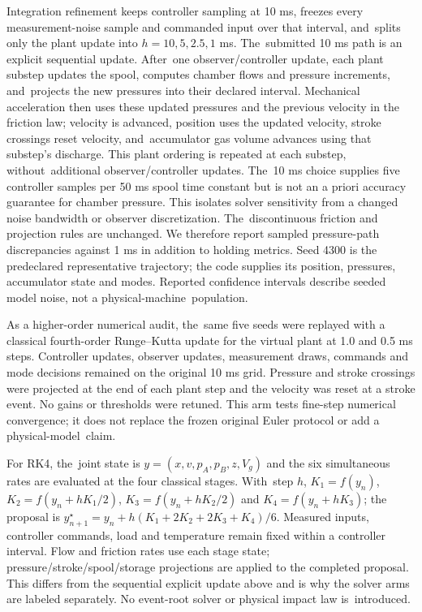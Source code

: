 \documentclass[machines,article,submit,pdftex,moreauthors]{Definitions/mdpi}
\begin{document}
Integration refinement keeps controller sampling at 10 ms, freezes every measurement-noise sample and commanded input over that interval, and~splits only the plant update into $h=10,5,2.5,1$ ms. The~submitted 10 ms path is an explicit sequential update. After~one observer/controller update, each plant substep updates the spool, computes chamber flows and pressure increments, and~projects the new pressures into their declared interval. Mechanical acceleration then uses these updated pressures and the previous velocity in the friction law; velocity is advanced, position uses the updated velocity, stroke crossings reset velocity, and~accumulator gas volume advances using that substep's discharge. This plant ordering is repeated at each substep, without~additional observer/controller updates. The~10 ms choice supplies five controller samples per 50 ms spool time constant but is not an a priori accuracy guarantee for chamber pressure. This isolates solver sensitivity from a changed noise bandwidth or observer discretization. The~discontinuous friction and projection rules are unchanged. We therefore report sampled pressure-path discrepancies against 1 ms in addition to holding metrics. Seed 4300 is the predeclared representative trajectory; the code supplies its position, pressures, accumulator state and modes. Reported confidence intervals describe seeded model noise, not a physical-machine~population.

As a higher-order numerical audit, the~same five seeds were replayed with a classical fourth-order Runge--Kutta update for the virtual plant at 1.0 and 0.5 ms steps. Controller updates, observer updates, measurement draws, commands and mode decisions remained on the original 10 ms grid. Pressure and stroke crossings were projected at the end of each plant step and the velocity was reset at a stroke event. No gains or thresholds were retuned. This arm tests fine-step numerical convergence; it does not replace the frozen original Euler protocol or add a physical-model~claim.

For RK4, the~joint state is $y=(x,v,p_A,p_B,z,V_g)$ and the six simultaneous rates are evaluated at the four classical stages. With~step $h$, $K_1=f(y_n)$, $K_2=f(y_n+hK_1/2)$, $K_3=f(y_n+hK_2/2)$ and $K_4=f(y_n+hK_3)$; the proposal is $y_{n+1}^{\star}=y_n+h(K_1+2K_2+2K_3+K_4)/6$. Measured inputs, controller commands, load and temperature remain fixed within a controller interval. Flow and friction rates use each stage state; pressure/stroke/spool/storage projections are applied to the completed proposal. This differs from the sequential explicit update above and is why the solver arms are labeled separately. No event-root solver or physical impact law is~introduced.
\end{document}
